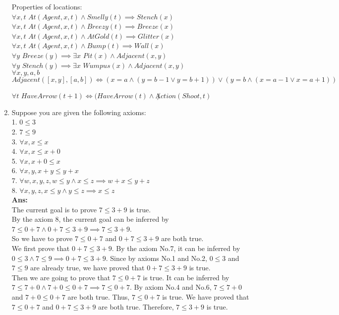 \documentclass[12pt]{article}
\begin{document}
\begin{enumerate}
Properties of locations:\\
\(\forall x, t\) \(At(Agent, x, t) \land Smelly(t) \implies Stench(x)\)\\
\(\forall x, t\) \(At(Agent, x, t) \land Breezy(t) \implies Breeze(x)\)\\
\(\forall x, t\) \(At(Agent, x, t) \land AtGold(t) \implies Glitter(x)\)\\
\(\forall x, t\) \(At(Agent, x, t) \land Bump(t) \implies Wall(x)\)\\

\(\forall y\) \(Breeze(y) \implies \exists x\) \(Pit(x) \land Adjacent(x, y)\)\\
\(\forall y\) \(Stench(y) \implies \exists x\) \(Wumpus(x) \land Adjacent(x, y)\)\\

\(\forall x, y, a, b\) \(Adjacent([x, y], [a, b]) \iff (x = a \land (y=b-1 \lor y = b+1)) \lor (y=b \land (x=a-1 \lor x=a+1))\)

\(\forall t\) \(HaveArrow(t+1) \iff (HaveArrow(t) \land \not Action(Shoot, t)\)




\item{Suppose you are given the following axioms: \\
1. \(0 \leq 3\) \\
2. \(7 \leq 9\) \\
3. \(\forall x, x \leq x\) \\
4. \(\forall x, x \leq x + 0\) \\
5. \(\forall x, x + 0 \leq x\) \\
6. \(\forall x,y, x + y \leq y + x\) \\
7. \(\forall w,x,y,z, w \leq y \land x \leq z \implies w + x \leq y + z\) \\
8. \(\forall x,y,z, x \leq y \land y \leq z \implies x \leq z \)
\\
\textbf{Ans:}\\
The current goal is to prove \(7 \leq 3 + 9\) is true.\\
By the axiom 8, the current goal can be inferred by \(7 \leq 0 + 7 \land 0 + 7 \leq 3 + 9 \implies 7 \leq 3 + 9\).\\
So we have to prove \(7 \leq 0 + 7\) and \(0 + 7 \leq 3 + 9\) are both true.\\
We first prove that  \(0 + 7 \leq 3 + 9\). By the axiom No.7, it can be inferred by \(0 \leq 3 \land 7 \leq 9 \implies 0 + 7 \leq 3 + 9\). Since by axioms No.1 and No.2, \(0 \leq 3\) and \(7 \leq 9\) are already true, we have proved that \(0 + 7 \leq 3 + 9\) is true.\\
Then we are going to prove that \(7 \leq 0 + 7\) is true. It can be inferred by \(7 \leq 7 + 0 \land 7 + 0 \leq 0 + 7 \implies 7 \leq 0 + 7\). By axiom No.4 and No.6, \(7 \leq 7 + 0 \) and \(7 + 0 \leq 0 + 7\) are both true. Thus, \(7 \leq 0 + 7\) is true. We have proved that \(7 \leq 0 + 7\) and \(0 + 7 \leq 3 + 9\) are both true. Therefore, \(7 \leq 3 + 9\) is true.

}
\end{enumerate}
\end{document}
